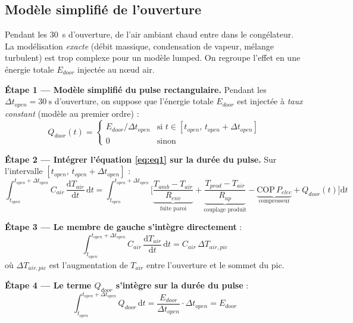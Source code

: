 \documentclass[11pt,a4paper]{article}
\begin{document}
\subsection{Modèle simplifié de l'ouverture}

Pendant les \SI{30}{\second} d'ouverture, de l'air ambiant chaud entre dans le congélateur.
La modélisation \emph{exacte} (débit massique, condensation de vapeur, mélange turbulent)
est trop complexe pour un modèle lumped. On regroupe l'effet en une énergie totale $E_{door}$
injectée au nœud air.

\begin{demo}
\textbf{Étape 1 — Modèle simplifié du pulse rectangulaire.}
Pendant les $\Delta t_{open} = \SI{30}{\second}$ d'ouverture, on suppose que l'énergie
totale $E_{door}$ est injectée à \emph{taux constant} (modèle au premier ordre) :
\begin{equation}
Q_{door}(t) = \begin{cases} E_{door} / \Delta t_{open} & \text{si } t \in [t_{open},\, t_{open} + \Delta t_{open}]\\ 0 & \text{sinon}\end{cases}
\label{eq:Qdoor_pulse}
\end{equation}

\textbf{Étape 2 — Intégrer l'équation \eqref{eq:eq1} sur la durée du pulse.}
Sur l'intervalle $[t_{open},\, t_{open}+\Delta t_{open}]$ :
\begin{equation}
\int_{t_{open}}^{t_{open}+\Delta t_{open}}\!\! C_{air}\,\frac{\mathrm{d}T_{air}}{\mathrm{d}t}\,\mathrm{d}t
= \int_{t_{open}}^{t_{open}+\Delta t_{open}}\!\!\!\Big[\underbrace{\frac{T_{amb}-T_{air}}{R_{env}}}_{\text{fuite paroi}} + \underbrace{\frac{T_{prod}-T_{air}}{R_{ap}}}_{\text{couplage produit}} - \underbrace{\mathrm{COP}\,P_{elec}}_{\text{compresseur}} + Q_{door}(t)\Big]\!\mathrm{d}t
\end{equation}

\textbf{Étape 3 — Le membre de gauche s'intègre directement} :
\begin{equation}
\int_{t_{open}}^{t_{open}+\Delta t_{open}}\!\! C_{air}\,\frac{\mathrm{d}T_{air}}{\mathrm{d}t}\,\mathrm{d}t
= C_{air}\,\Delta T_{air,pic}
\end{equation}
où $\Delta T_{air,pic}$ est l'augmentation de $T_{air}$ entre l'ouverture et le sommet
du pic.

\textbf{Étape 4 — Le terme $Q_{door}$ s'intègre sur la durée du pulse} :
\begin{equation}
\int_{t_{open}}^{t_{open}+\Delta t_{open}}\!\! Q_{door}\,\mathrm{d}t
= \frac{E_{door}}{\Delta t_{open}} \cdot \Delta t_{open} = E_{door}
\end{equation}


\end{demo}
\end{document}
